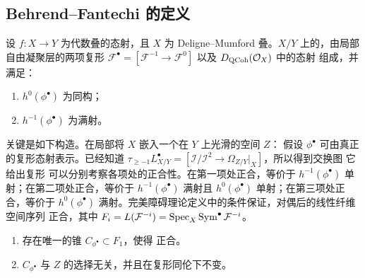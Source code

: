 \subsection{Behrend--Fantechi 的定义}
\begin{definition}[完美障碍理论]\label{def:3.5}
设 $f:X\to Y$ 为代数叠的态射，且 $X$ 为 Deligne--Mumford 叠。$X/Y$ 上的，由局部自由凝聚层的两项复形 $\mathcal F^\bullet=[\mathcal F^{-1}\to \mathcal F^0]$ 以及 $D_{\mathrm{QCoh}}(\mathcal O_X)$ 中的态射
组成，并满足：
\begin{enumerate}
\item $h^0(\phi^\bullet)$ 为同构；
\item $h^{-1}(\phi^\bullet)$ 为满射。
\end{enumerate}
\end{definition}
关键是如下构造。在局部将 $X$ 嵌入一个在 $Y$ 上光滑的空间 $Z$：
假设 $\phi^\bullet$ 可由真正的复形态射表示。已经知道 $\tau_{\ge-1}L_{X/Y}^\bullet=[\mathcal I/\mathcal I^2\to\Omega_{Z/Y}|_X]$，所以得到交换图
它给出复形
可以分别考察各项处的正合性。在第一项处正合，等价于 $h^{-1}(\phi^\bullet)$ 单射；在第二项处正合，等价于 $h^{-1}(\phi^\bullet)$ 满射且 $h^0(\phi^\bullet)$ 单射；在第三项处正合，等价于 $h^0(\phi^\bullet)$ 满射。完美障碍理论定义中的条件保证，对偶后的线性纤维空间序列
正合，其中 $F_i=L(\mathcal F^{-i})=\operatorname{Spec}_X\operatorname{Sym}^\bullet \mathcal F^{-i}$。
\begin{lemma}\label{lem:3.8}
\begin{enumerate}[label=(\alph*)]
\item 存在唯一的锥 $C_{\phi^\bullet}\subset F_1$，使得
正合。
\item $C_{\phi^\bullet}$ 与 $Z$ 的选择无关，并且在复形同伦下不变。
\end{enumerate}
\end{lemma}

